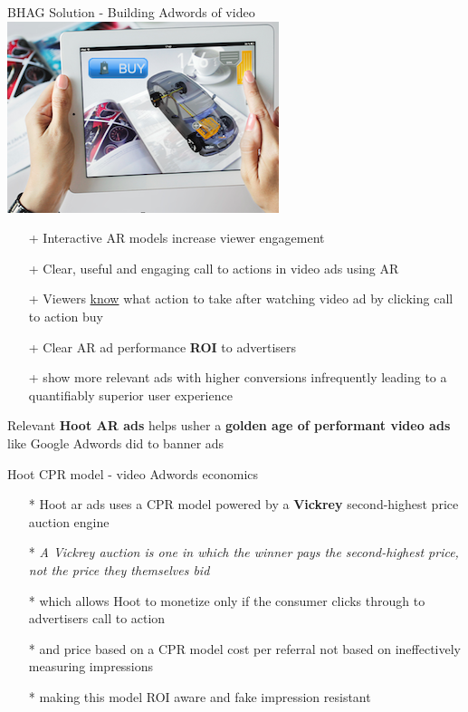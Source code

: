 \documentclass[12pt]{beamer}
\begin{document}
\begin{frame}[fragile]{BHAG Solution -  Building Adwords of video \includegraphics[scale=.1]{static/arad/arad5} }
\begin{itemize}[<+-| alert@+>]
\item[+]Interactive AR models increase viewer engagement
\item[+]Clear, useful and engaging call to actions in video ads using AR
\item[+]Viewers \underline{know} what action to take after watching video ad by clicking call to action buy 
\item[+]Clear AR ad performance \textbf{ROI} to advertisers 
\item[+]show more relevant ads with higher conversions infrequently leading to a quantifiably superior user experience 
\end{itemize}
\pause
Relevant \textbf{Hoot AR ads} helps usher a \textbf{golden age of performant video ads }like Google Adwords did to banner ads


\end{frame}

\begin{frame}[t]{Hoot CPR model - video Adwords economics}
\begin{itemize}[<+-| alert@+>]
\item[*]Hoot ar ads uses a CPR model powered by a \textbf{Vickrey} second-highest price auction engine
\item[*]\emph{A Vickrey auction is one in which the winner pays the second-highest price, not the price they themselves bid}
\item[*]which allows Hoot to monetize only if the consumer clicks through to advertisers call to action
\item[*]and price based on a CPR model cost per referral not based on ineffectively measuring impressions
\item[*]making this model ROI aware and fake impression resistant
\end{itemize}
\end{frame}
\end{document}
